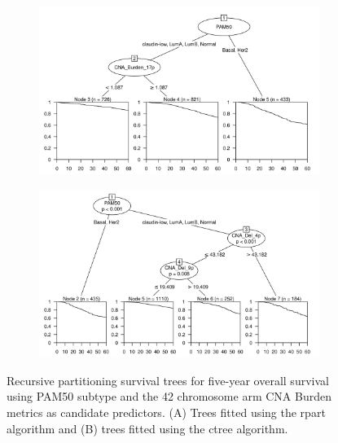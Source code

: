 \begin{figure}[!htb]
\centering

\vspace{0.5cm}

\begin{subfigure}{\textwidth}
\subcaption{}
\includegraphics[width=1\textwidth]{../figures/Appendices/Appendix_B/PA_PartyKit_Survival_Burden_FiveYearOS_PAM50.png}
\end{subfigure}

\vspace{2cm}

\begin{subfigure}{\textwidth}
\subcaption{}
\includegraphics[width=1\textwidth]{../figures/Appendices/Appendix_B/PA_Ctree_Survival_Burden_FiveYearOS_PAM50.png}
\end{subfigure}

\vspace{0.5cm}

\caption[Recursive partitioning survival trees for five-year overall survival using PAM50 subtype and the 42 chromosome arm CNA Burden metrics as candidate predictors.]{Recursive partitioning survival trees for five-year overall survival using PAM50 subtype and the 42 chromosome arm CNA Burden metrics as candidate predictors. (A) Trees fitted using the rpart algorithm and (B) trees fitted using the ctree algorithm.}
\end{figure}

